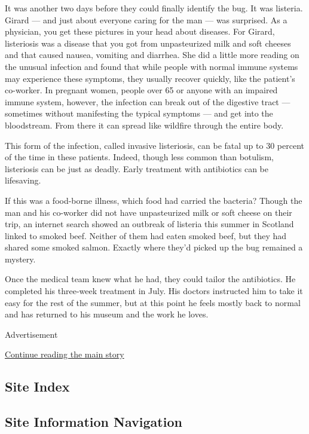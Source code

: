 It was another two days before they could finally identify the bug. It
was listeria. Girard --- and just about everyone caring for the man ---
was surprised. As a physician, you get these pictures in your head about
diseases. For Girard, listeriosis was a disease that you got from
unpasteurized milk and soft cheeses and that caused nausea, vomiting and
diarrhea. She did a little more reading on the unusual infection and
found that while people with normal immune systems may experience these
symptoms, they usually recover quickly, like the patient's co-worker. In
pregnant women, people over 65 or anyone with an impaired immune system,
however, the infection can break out of the digestive tract ---
sometimes without manifesting the typical symptoms --- and get into the
bloodstream. From there it can spread like wildfire through the entire
body.

This form of the infection, called invasive listeriosis, can be fatal up
to 30 percent of the time in these patients. Indeed, though less common
than botulism, listeriosis can be just as deadly. Early treatment with
antibiotics can be lifesaving.

If this was a food-borne illness, which food had carried the bacteria?
Though the man and his co-worker did not have unpasteurized milk or soft
cheese on their trip, an internet search showed an outbreak of listeria
this summer in Scotland linked to smoked beef. Neither of them had eaten
smoked beef, but they had shared some smoked salmon. Exactly where
they'd picked up the bug remained a mystery.

Once the medical team knew what he had, they could tailor the
antibiotics. He completed his three-week treatment in July. His doctors
instructed him to take it easy for the rest of the summer, but at this
point he feels mostly back to normal and has returned to his museum and
the work he loves.

Advertisement

\protect\hyperlink{after-bottom}{Continue reading the main story}

\hypertarget{site-index}{%
\subsection{Site Index}\label{site-index}}

\hypertarget{site-information-navigation}{%
\subsection{Site Information
Navigation}\label{site-information-navigation}}

